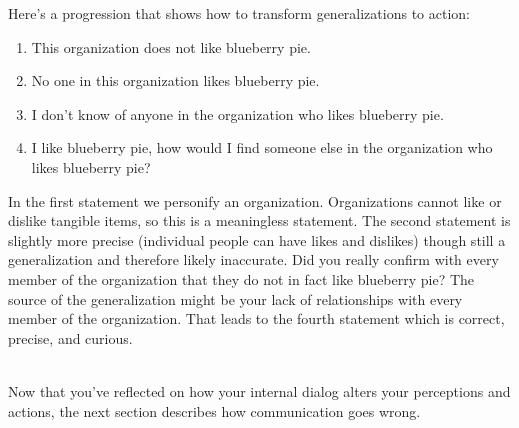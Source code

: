 Here's a progression that shows how to transform generalizations to action: 
\begin{enumerate}
    \item This organization does not like blueberry pie.
    \item No one in this organization likes blueberry pie.
    \item I don't know of anyone in the organization who likes blueberry pie.
    \item I like blueberry pie, how would I find someone else in the organization who likes blueberry pie?
\end{enumerate}
In the first statement we personify an organization. Organizations cannot like or dislike tangible items, so this is a meaningless statement. The second statement is slightly more precise (individual people can have likes and dislikes) though still a generalization and therefore likely inaccurate. Did you really confirm with every member of the organization that they do not in fact like blueberry pie? The source of the generalization might be your lack of relationships with every member of the organization. That leads to the fourth statement which is correct, precise, and curious. 

\ \\

Now that you've reflected on how your internal dialog alters your perceptions and actions, the next section describes how communication goes wrong.